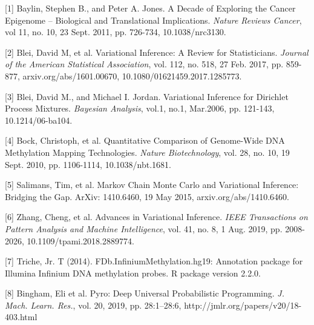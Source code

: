 \documentclass{article}
\begin{document}
\medskip
{
\small

[1] Baylin, Stephen B., and Peter A. Jones.  A Decade of Exploring the Cancer Epigenome -- Biological and Translational Implications.  {\it Nature Reviews Cancer}, vol 11, no. 10, 23 Sept. 2011, pp. 726-734, 10.1038/nrc3130.

[2] Blei, David M, et al. Variational Inference: A Review for Statisticians. {\it Journal of the American Statistical Association}, vol. 112, no. 518, 27 Feb. 2017, pp. 859-877, arxiv.org/abs/1601.00670, 10.1080/01621459.2017.1285773.

[3] Blei, David M., and Michael I. Jordan. Variational Inference for Dirichlet Process Mixtures. {\it Bayesian Analysis}, vol.1, no.1, Mar.2006, pp. 121-143, 10.1214/06-ba104.

[4] Bock, Christoph, et al. Quantitative Comparison of Genome-Wide DNA Methylation Mapping Technologies. {\it Nature Biotechnology}, vol. 28, no. 10, 19 Sept. 2010, pp. 1106-1114, 10.1038/nbt.1681.

[5] Salimans, Tim, et al.  Markov Chain Monte Carlo and Variational Inference: Bridging the Gap. ArXiv: 1410.6460, 19 May 2015, arxiv.org/abs/1410.6460.

[6] Zhang, Cheng, et al. Advances in Variational Inference. {\it IEEE Transactions on Pattern Analysis and Machine Intelligence}, vol. 41, no. 8, 1 Aug. 2019, pp. 2008-2026, 10.1109/tpami.2018.2889774.

[7] Triche, Jr. T (2014). FDb.InfiniumMethylation.hg19: Annotation package for Illumina Infinium DNA methylation probes. R package version 2.2.0.

[8] Bingham, Eli et al. Pyro: Deep Universal Probabilistic Programming. \textit{J. Mach. Learn. Res.}, vol. 20, 2019, pp. 28:1--28:6, http://jmlr.org/papers/v20/18-403.html
}
\end{document}
